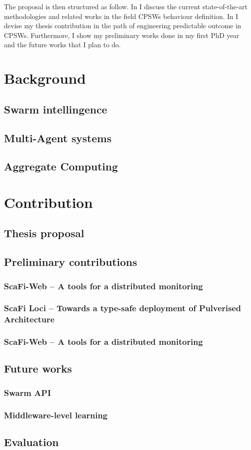 \documentclass[11pt]{article}
\begin{document}
The proposal is then structured as follow. In  I discuss the current state-of-the-art methodologies and related works in the field CPSWs behaviour definition.
In  I devise my thesis contribution in the path of engineering predictable outcome in CPSWs. Furthermore, I show my preliminary works done in my first PhD year and the future works that I plan to do. 


\section{Background} \label{background}
\subsection{Swarm intellingence}
\subsection{Multi-Agent systems}
\subsection{Aggregate Computing}
\section{Contribution} \label{contribution}
\subsection{Thesis proposal}
\subsection{Preliminary contributions}
\subsubsection{ScaFi-Web -- A tools for a distributed monitoring}
\subsubsection{ScaFi Loci -- Towards a type-safe deployment of Pulverised Architecture}
\subsubsection{ScaFi-Web -- A tools for a distributed monitoring}
\subsection{Future works}
\subsubsection{Swarm API}
\subsubsection{Middleware-level learning}
\subsection{Evaluation}\label{evaluation}
\nocite{*}


\end{document}
